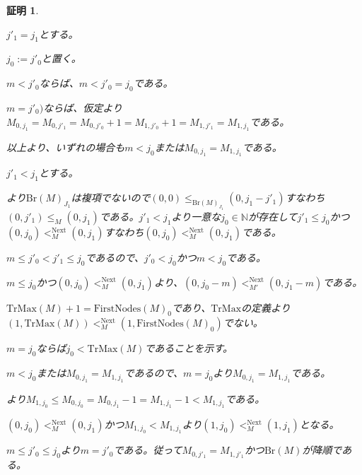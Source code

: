 \documentclass[dvipdfmx,uplatex]{jsarticle}
\theoremstyle{customnonumberbreakfortheorem}
\theoremstyle{customnonumberbreakforproof}
\newtheorem{hideableproof}{証明}
\begin{document}
\begin{hideableproof}
	\begin{indented}
		\item \(j'_1 = j_1\)とする。
		\begin{indented}
			\item \(j_0 := j'_0\)と置く。
			\item \(m < j'_0\)ならば、\(m < j'_0 = j_0\)である。
			\item \(m = j'_0)\)ならば、仮定より\(M_{0,j_1} = M_{0,j'_1} = M_{0,j'_0}+1 = M_{1,j'_0}+1 = M_{1,j'_1} = M_{1,j_1}\)である。
			\item 以上より、いずれの場合も\(m < j_0\)または\(M_{0,j_1} = M_{1,j_1}\)である。
		\end{indented}
		\item \(j'_1 < j_1\)とする。
		\begin{indented}
			\item {}より\(\textrm{Br}(M)_{J_1}\)は複項でないので\((0,0) \leq_{\textrm{Br}(M)_{J_1}} (0,j_1-j'_1)\)すなわち\((0,j'_1) \leq_M (0,j_1)\)である。\(j'_1 < j_1\)より一意な\(j_0 \in \mathbb{N}\)が存在して\(j'_1 \leq j_0\)かつ\((0,j_0) <_M^{\textrm{Next}} (0,j_1)\)すなわち\((0,j_0) <_M^{\textrm{Next}} (0,j_1)\)である。
			\item \(m \leq j'_0 < j'_1 \leq j_0\)であるので、\(j'_0 < j_0\)かつ\(m < j_0\)である。
		\end{indented}
		\item \(m \leq j_0\)かつ\((0,j_0) <_M^{\textrm{Next}} (0,j_1)\)より、\((0,j_0-m) <_{M'}^{\textrm{Next}} (0,j_1-m)\)である。
		\item \(\textrm{TrMax}(M)+1 = \textrm{FirstNodes}(M)_0\)であり、\(\textrm{TrMax}\)の定義より\((1,\textrm{TrMax}(M)) <_M^{\textrm{Next}} (1,\textrm{FirstNodes}(M)_0)\)でない。
		\item
		\item \(m = j_0\)ならば\(j_0 < \textrm{TrMax}(M)\)であることを示す。
		\begin{indented}
			\item \(m < j_0\)または\(M_{0,j_1} = M_{1,j_1}\)であるので、\(m = j_0\)より\(M_{0,j_1} = M_{1,j_1}\)である。
			\item {}より\(M_{1,j_0} \leq M_{0,j_0} = M_{0,j_1}-1 = M_{1,j_1}-1 < M_{1,j_1}\)である。
			\item \((0,j_0) <_M^{\textrm{Next}} (0,j_1)\)かつ\(M_{1,j_0} < M_{1,j_1}\)より\((1,j_0) <_M^{\textrm{Next}} (1,j_1)\)となる。
			\item \(m \leq j'_0 \leq j_0\)より\(m = j'_0\)である。従って\(M_{0,j'_1} = M_{1,j'_1}\)かつ\(\textrm{Br}(M)\)が降順である。

\end{indented}
\end{indented}
\end{hideableproof}
\end{document}
